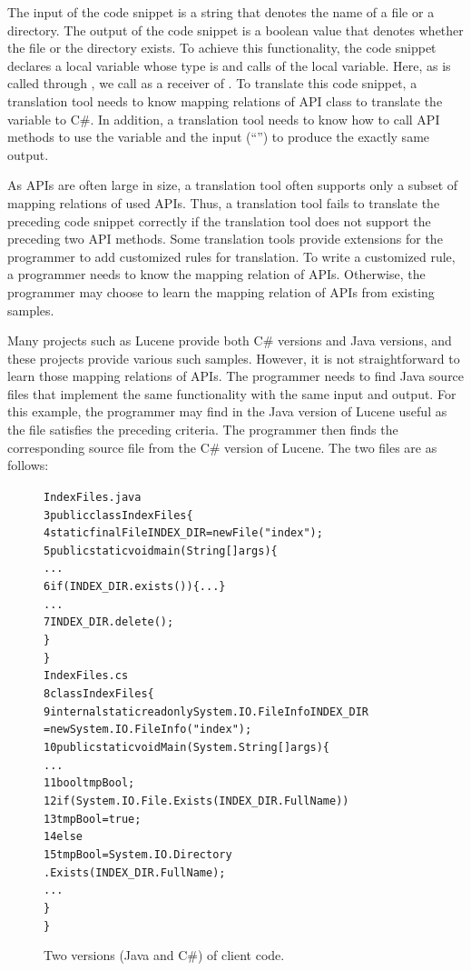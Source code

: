 The input of the code snippet is a string that denotes the name of a
file or a directory. The output of the code snippet is a boolean
value that denotes whether the file or the directory exists. To
achieve this functionality, the code snippet declares a local
variable whose type is  and calls
 of the local variable. Here, as 
is called through , we call  as a receiver
of . To translate this code snippet, a translation
tool needs to know mapping relations of API class to translate the
variable  to C\#. In addition, a translation tool needs
to know how to call API methods to use the variable and the input
(``'') to produce the exactly same output.

As APIs are often large in size, a translation tool often supports
only a subset of mapping relations of used APIs. Thus, a translation
tool fails to translate the preceding code snippet correctly if the
translation tool does not support the preceding two API methods.
Some translation tools provide extensions for the programmer to add
customized rules for translation. To write a customized rule, a
programmer needs to know the mapping relation of APIs. Otherwise,
the programmer may choose to learn the mapping relation of APIs from
existing samples.

Many projects such as Lucene provide both C\# versions and Java
versions, and these projects provide various such samples. However,
it is not straightforward to learn those mapping relations of APIs.
The programmer needs to find Java source files that implement the
same functionality with the same input and output. For this example,
the programmer may find  in the Java version
of Lucene useful as the file satisfies the preceding criteria. The
programmer then finds the corresponding source file
 from the C\# version of Lucene. The two files
are as follows:

\begin{figure}[t]
\begin{CodeOut}\vspace*{-2ex}
\begin{alltt}
                  IndexFiles.java
3 public class IndexFiles \{
4   static final File INDEX_DIR = new File("index");
5   public static void main(String[] args) \{
      ...
6     if (INDEX_DIR.exists()) \{...\}
      ...
7       INDEX_DIR.delete();
    \}
  \}
                  IndexFiles.cs
8 class IndexFiles\{
9   internal static readonly System.IO.FileInfo INDEX_DIR
          = new System.IO.FileInfo("index");
10   public static void  Main(System.String[] args)\{
      ...
11     bool tmpBool;
12     if (System.IO.File.Exists(INDEX_DIR.FullName))
13       tmpBool = true;
14    else
15       tmpBool = System.IO.Directory
                         .Exists(INDEX_DIR.FullName);
      ...
    \}
 \}
\end{alltt}
\end{CodeOut}\vspace*{-1ex}
\caption{\label{fig:clientcode} Two versions (Java and C\#) of client code.}\vspace*{-1ex}
\end{figure}

